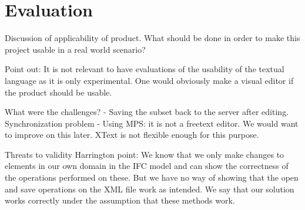 \section{Evaluation}
Discussion of applicability of product. What should be done in order to make this project usable in a real world scenario?

Point out: It is not relevant to have evaluations of the usability of the textual language as it is only experimental. One would obviously make a visual editor if the product should be usable.

What were the challenges?
- Saving the subset back to the server after editing. Synchronization problem
- Using MPS: it is not a freetext editor. We would want to improve on this later. XText is not flexible enough for this purpose.



Threats to validity
Harrington point: We know that we only make changes to elements in our own domain in the IFC model and can show the correctness of the operations performed on these. But we have no way of showing that the open and save operations on the XML file work as intended. We say that our solution works correctly under the assumption that these methods work.